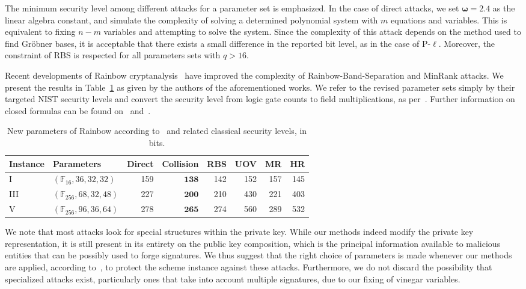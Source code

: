 \documentclass[12pt, a4paper, oneside]{memoir}
\theoremstyle{definition}
\begin{document}
The minimum security level among different attacks for a parameter set is emphasized. In the case of direct attacks, we set $\bm{\omega} = 2.4$ as the linear algebra constant, and simulate the complexity of solving a determined polynomial system with $m$ equations and variables. This is equivalent to fixing $n - m$ variables and attempting to solve the system. Since the complexity of this attack depends on the method used to find Gröbner bases, it is acceptable that there exists a small difference in the reported bit level, as in the case of P-$\ell$. Moreover, the constraint of RBS is respected for all parameters sets with $q > 16$. 

Recent developments of Rainbow cryptanalysis~\cite{Ding:202006} have improved the complexity of Rainbow-Band-Separation and MinRank attacks. We present the results in Table~\ref{tab:newsec} as given by the authors of the aforementioned works. We refer to the revised parameter sets simply by their targeted NIST security levels and convert the security level from logic gate counts to field multiplications, as per~\cite[p.~35]{Ding:201901}. Further information on closed formulas can be found on~\cite[Eq.~19]{Nakamura:202006} and~\cite[Sec.~5]{Nakamura:202007}.

\begin{table}[htbp]
  \centering
  \renewcommand{\arraystretch}{1.2}
  \caption{New parameters of Rainbow according to~\cite[Sec.~4]{Ding:202006} and related classical security levels, in bits.}\label{tab:newsec}
  \begin{tabular}{*{2}{l}*{6}{r}}
    \toprule
    Instance & Parameters & Direct & Collision & RBS & UOV & MR & HR \\
    \midrule
    I    & $(\mathbb{F}_{ 16}, 36, 32, 32)$  &              159 &  $\mathbf{ 138}$ &              142 &              152 &              157 &              145 \\
    III  & $(\mathbb{F}_{256}, 68, 32, 48)$  &              227 &  $\mathbf{ 200}$ &              210 &              430 &              221 &              403 \\
    V    & $(\mathbb{F}_{256}, 96, 36, 64)$  &              278 &  $\mathbf{ 265}$ &              274 &              560 &              289 &              532 \\
    \bottomrule
  \end{tabular}
\end{table}

We note that most attacks look for special structures within the private key. While our methods indeed modify the private key representation, it is still present in its entirety on the public key composition, which is the principal information available to malicious entities that can be possibly used to forge signatures. We thus suggest that the right choice of parameters is made whenever our methods are applied, according to~\cite{Petzoldt:201005}, to protect the scheme instance against these attacks. Furthermore, we do not discard the possibility that specialized attacks exist, particularly ones that take into account multiple signatures, due to our fixing of vinegar variables. 
\end{document}
